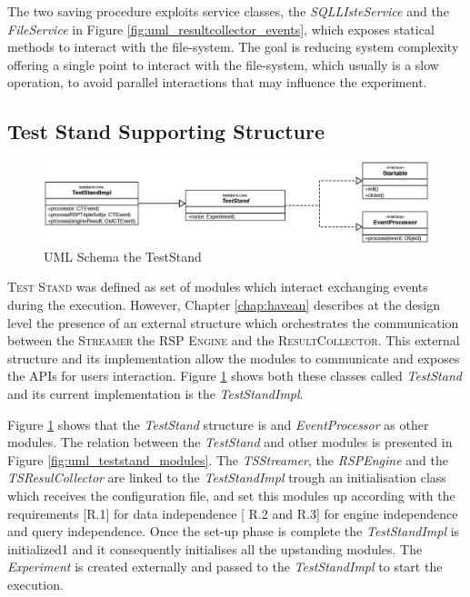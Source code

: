 The two saving procedure exploits service classes, the \textit{SQLLIsteService} and the \textit{FileService} in Figure \ref{fig:uml_resultcollector_events}, which exposes statical methods to interact with the file-system. The goal is  reducing system complexity offering a single point to interact with the file-system, which usually is a slow operation, to avoid parallel interactions that may influence the experiment. 


\subsection{Test Stand Supporting Structure}\label{sec:teststand}


\begin{figure}[tbh]
  \centering
	\includegraphics[width=\linewidth]{images/uml_teststand}
	\caption{UML Schema the TestStand} 
  	\label{fig:uml_teststand}
\end{figure}


\name \textsc{Test Stand} was defined as set of modules which interact exchanging events during the execution. However, Chapter \ref{chap:havean} describes at the design level the presence of an external structure which orchestrates the communication between the \textsc{Streamer} the \textsc{RSP Engine} and the \textsc{ResultCollector}. This external structure and its implementation allow the modules to communicate and exposes the APIs for users interaction. Figure \ref{fig:uml_teststand} shows both these classes called \textit{TestStand} and its current implementation is the \textit{TestStandImpl}.


Figure \ref{fig:uml_teststand} shows that the \textit{TestStand} structure is and \textit{EventProcessor} as other modules. The relation between the \textit{TestStand} and other modules is presented in Figure \ref{fig:uml_teststand_modules}. The \textit{TSStreamer}, the \textit{RSPEngine} and the \textit{TSResulCollector} are linked to the \textit{TestStandImpl} trough an initialisation class which receives the configuration file, and set this modules up according with the requirements [R.1] for data independence  [ R.2 and R.3] for engine independence and query independence. Once the set-up phase is complete the \textit{TestStandImpl} is initialized1 and it consequently initialises all the upstanding modules. The \textit{Experiment} is created externally and passed to the \textit{TestStandImpl} to start the execution. 

